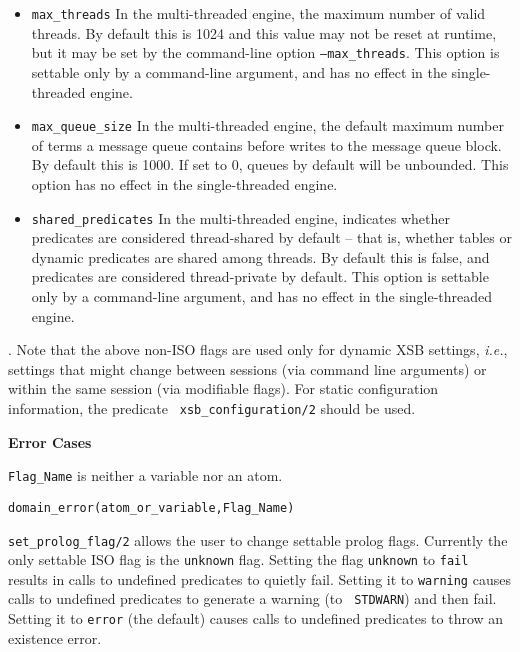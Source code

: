 \begin{description}
\begin{itemize}
\item {\tt max\_threads} In the multi-threaded engine, the maximum
  number of valid threads.  By default this is 1024 and this value may
  not be reset at runtime, but it may be set by the command-line
  option {\tt --max\_threads}.  This option is settable only by a
  command-line argument, and has no effect in the single-threaded
  engine.

\item {\tt max\_queue\_size} In the multi-threaded engine, the default
  maximum number of terms a message queue contains before writes to
  the message queue block.  By default this is 1000.  If set to 0,
  queues by default will be unbounded.  This option has no effect in
  the single-threaded engine.

\item {\tt shared\_predicates} In the multi-threaded engine, indicates
  whether predicates are considered thread-shared by default -- that
  is, whether tables or dynamic predicates are shared among threads.
  By default this is false, and predicates are considered
  thread-private by default.  This option is settable only by a
  command-line argument, and has no effect in the
  single-threaded engine.

\end{itemize}
    
.  
%
Note that the above non-ISO flags are used only for dynamic XSB
settings, {\it i.e.}, settings that might change between sessions (via
command line arguments) or within the same session (via modifiable
flags).  For static configuration information, the predicate {\tt
  xsb\_configuration/2} should be used.

{\bf Error Cases}
\bi
\item 	{\tt Flag\_Name} is neither a variable nor an atom.
\bi
\item 	{\tt domain\_error(atom\_or\_variable,Flag\_Name)}
\ei
\ei

%
{\tt set\_prolog\_flag/2} allows the user to change settable prolog
flags.  Currently the only settable ISO flag is the {\tt unknown}
flag.  Setting the flag {\tt unknown} to {\tt fail} results in calls
to undefined predicates to quietly fail.  Setting it to {\tt warning}
causes calls to undefined predicates to generate a warning (to {\tt
  STDWARN}) and then fail.  Setting it to {\tt error} (the default)
causes calls to undefined predicates to throw an existence error.


\end{description}
